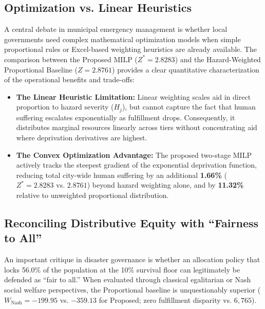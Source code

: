 \subsection{Optimization vs. Linear Heuristics}
A central debate in municipal emergency management is whether local governments need complex mathematical optimization models when simple proportional rules or Excel-based weighting heuristics are already available. The comparison between the Proposed MILP ($Z^* = 2.8283$) and the Hazard-Weighted Proportional Baseline ($Z = 2.8761$) provides a clear quantitative characterization of the operational benefits and trade-offs:
\begin{itemize}
    \item \textbf{The Linear Heuristic Limitation:} Linear weighting scales aid in direct proportion to hazard severity ($H_j$), but cannot capture the fact that human suffering escalates exponentially as fulfillment drops. Consequently, it distributes marginal resources linearly across tiers without concentrating aid where deprivation derivatives are highest.
    \item \textbf{The Convex Optimization Advantage:} The proposed two-stage MILP actively tracks the steepest gradient of the exponential deprivation function, reducing total city-wide human suffering by an additional \textbf{1.66\%} ($Z^* = 2.8283$ vs. $2.8761$) beyond hazard weighting alone, and by \textbf{11.32\%} relative to unweighted proportional distribution.
\end{itemize}

\subsection{Reconciling Distributive Equity with ``Fairness to All''}
An important critique in disaster governance is whether an allocation policy that locks 56.0\% of the population at the 10\% survival floor can legitimately be defended as ``fair to all.'' When evaluated through classical egalitarian or Nash social welfare perspectives, the Proportional baseline is unquestionably superior ($W_{\text{Nash}} = -199.95$ vs. $-359.13$ for Proposed; zero fulfillment disparity vs. $6{,}765$). 

